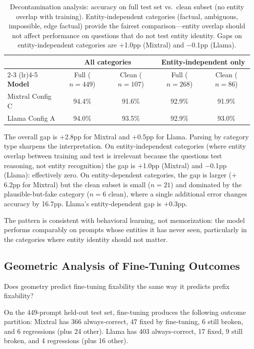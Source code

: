\begin{table}[ht]
\centering
\small
\begin{tabular}{@{}lcccc@{}}
\toprule
& \multicolumn{2}{c}{\textbf{All categories}} & \multicolumn{2}{c}{\textbf{Entity-independent only}} \\
\cmidrule(lr){2-3} \cmidrule(lr){4-5}
\textbf{Model} & Full ($n{=}449$) & Clean ($n{=}107$) & Full ($n{=}268$) & Clean ($n{=}86$) \\
\midrule
Mixtral Config C & 94.4\% & 91.6\% & 92.9\% & 91.9\% \\
Llama Config A & 94.0\% & 93.5\% & 92.9\% & 93.0\% \\
\bottomrule
\end{tabular}
\caption{Decontamination analysis: accuracy on full test set vs.\ clean subset (no entity overlap with training). Entity-independent categories (factual, ambiguous, impossible, edge factual) provide the fairest comparison---entity overlap should not affect performance on questions that do not test entity identity. Gaps on entity-independent categories are $+$1.0pp (Mixtral) and $-$0.1pp (Llama).}
\label{tab:decontamination}
\end{table}

The overall gap is $+$2.8pp for Mixtral and $+$0.5pp for Llama. Parsing by category type sharpens the interpretation. On entity-independent categories (where entity overlap between training and test is irrelevant because the questions test reasoning, not entity recognition) the gap is $+$1.0pp (Mixtral) and $-$0.1pp (Llama): effectively zero. On entity-dependent categories, the gap is larger ($+$6.2pp for Mixtral) but the clean subset is small ($n = 21$) and dominated by the plausible-but-fake category ($n = 6$ clean), where a single additional error changes accuracy by 16.7pp. Llama's entity-dependent gap is $+$0.3pp.

The pattern is consistent with behavioral learning, not memorization: the model performs comparably on prompts whose entities it has never seen, particularly in the categories where entity identity should not matter.

\subsection{Geometric Analysis of Fine-Tuning Outcomes}
\label{sec:ft-geometry}

Does geometry predict fine-tuning fixability the same way it predicts prefix fixability?

On the 449-prompt held-out test set, fine-tuning produces the following outcome partition: Mixtral has 366 always-correct, 47 fixed by fine-tuning, 6 still broken, and 6 regressions (plus 24 other). Llama has 403 always-correct, 17 fixed, 9 still broken, and 4 regressions (plus 16 other).

